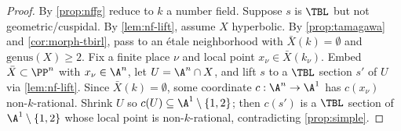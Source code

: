 \begin{proof}
  By \cref{prop:nffg} reduce to \(k\) a number field. Suppose \(s\) is \(\TBL\) but
  not geometric/cuspidal. By \cref{lem:nf-lift}, assume \(X\) hyperbolic. By
  \cref{prop:tamagawa} and \cref{cor:morph-tbirl}, pass to an étale neighborhood with
  \(\bar{X}(k) = \emptyset\) and \(\mathrm{genus}(X) \geq 2\). Fix a finite place
  \(\nu\) and local point \(x_\nu \in \bar{X}(k_\nu)\). Embed \(\bar{X} \subset \PP^n\)
  with \(x_\nu \in \A^n\), let \(U = \A^n \cap X\), and lift \(s\) to a \(\TBL\)
  section \(s'\) of \(U\) via \cref{lem:nf-lift}. Since \(\bar{X}(k) = \emptyset\),
  some coordinate \(c : \A^n \to \A^1\) has \(c(x_\nu)\) non-\(k\)-rational. Shrink
  \(U\) so \(c(U) \subseteq \A^1 \setminus \{1, 2\}\); then \(c(s')\) is a \(\TBL\)
  section of \(\A^1 \setminus \{1, 2\}\) whose local point is non-\(k\)-rational,
  contradicting \cref{prop:simple}.
\end{proof}

